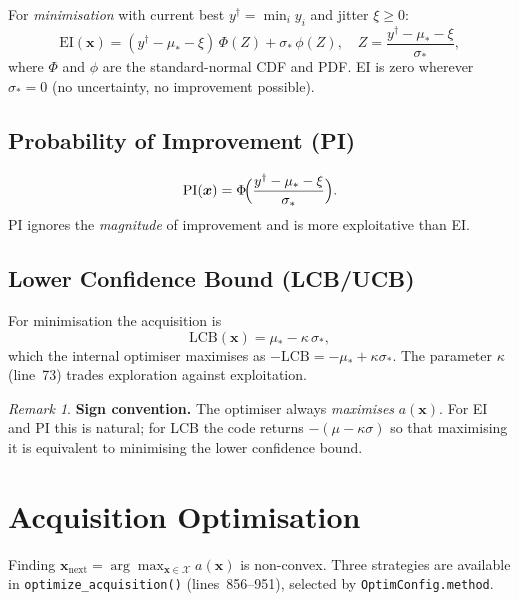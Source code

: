 \documentclass[11pt,a4paper]{article}
\newcommand{\bx}{\bm{x}}
\newcommand{\EI}{\mathrm{EI}}
\newcommand{\PI}{\mathrm{PI}}
\newcommand{\LCB}{\mathrm{LCB}}
\theoremstyle{remark}
\newtheorem{remark}{Remark}
\newcommand{\codeline}[1]{line~#1}
\newcommand{\coderange}[2]{lines~#1--#2}
\newcommand{\codefn}[1]{\texttt{#1()}}
\begin{document}
For \emph{minimisation} with current best $y^\dagger = \min_i y_i$ and
jitter $\xi \geq 0$:
\begin{equation}
  \label{eq:ei}
  \EI(\bx) = (y^\dagger - \mu_* - \xi)\,\Phi(Z)
             + \sigma_*\,\phi(Z),
  \quad Z = \frac{y^\dagger - \mu_* - \xi}{\sigma_*},
\end{equation}
where $\Phi$ and $\phi$ are the standard-normal CDF and PDF.  EI is zero
wherever $\sigma_* = 0$ (no uncertainty, no improvement possible).

\subsection{Probability of Improvement (PI)}
\begin{equation}
  \PI(\bx) = \Phi\!\Bigl(\frac{y^\dagger - \mu_* - \xi}{\sigma_*}\Bigr).
\end{equation}
PI ignores the \emph{magnitude} of improvement and is more exploitative
than EI.

\subsection{Lower Confidence Bound (LCB/UCB)}

For minimisation the acquisition is
\begin{equation}
  \LCB(\bx) = \mu_* - \kappa\,\sigma_*,
\end{equation}
which the internal optimiser maximises as $-\LCB = -\mu_* + \kappa\sigma_*$.
The parameter $\kappa$ (\codeline{73}) trades exploration against exploitation.

\begin{remark}
\textbf{Sign convention.}  The optimiser always \emph{maximises} $a(\bx)$.
For EI and PI this is natural; for LCB the code returns
$-(\mu - \kappa\sigma)$ so that maximising it is equivalent to minimising the
lower confidence bound.
\end{remark}

\section{Acquisition Optimisation}
\label{sec:acqopt}

Finding $\bx_{\mathrm{next}} = \arg\max_{\bx\in\mathcal{X}} a(\bx)$ is
non-convex.  Three strategies are available in \codefn{optimize\_acquisition}
(\coderange{856}{951}), selected by \texttt{OptimConfig.method}.
\end{document}
